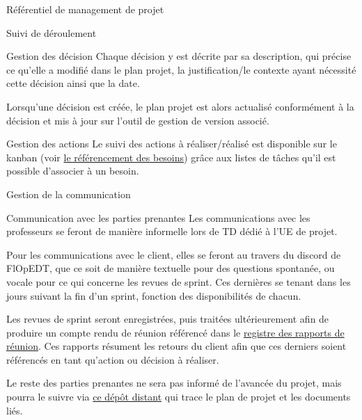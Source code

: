 \documentclass[]{article}
\begin{document}
{\begin{section}{\label{sec:Référentiel de management de projet}Référentiel de management de projet}
\begin{subsection}{\label{sec:Suivi de déroulement}Suivi de déroulement}
\begin{subsubsection}{\label{sec:Gestion des décision}Gestion des décision}
             Chaque décision y est décrite par sa description, qui précise ce qu’elle a modifié dans le plan projet, la justification/le contexte ayant nécessité cette décision ainsi que la date.

             Lorsqu’une décision est créée, le plan projet est alors actualisé conformément à la décision et mis à jour sur l’outil de gestion de version associé.
         \end{subsubsection}

         \begin{subsubsection}{\label{sec:Gestion des actions}Gestion des actions}
             Le suivi des actions à réaliser/réalisé est disponible sur le kanban (voir \hyperref[sec:Référencement des besoins]{le référencement des besoins}) grâce aux listes de tâches qu’il est possible d’associer à un besoin.
         \end{subsubsection}
     \end{subsection}

     \begin{subsection}{\label{sec:Gestion de la communication}Gestion de la communication}
         \begin{subsubsection}{\label{sec:Communication avec les parties prenantes}Communication avec les parties prenantes}
             Les communications avec les professeurs se feront de manière informelle lors de TD dédié à l’UE de projet.

             Pour les communications avec le client, elles se feront au travers du discord de FlOpEDT, que ce soit de manière textuelle pour des questions spontanée, ou vocale pour ce qui concerne les revues de sprint. Ces dernières se tenant dans les jours suivant la fin d’un sprint, fonction des disponibilités de chacun.

             Les revues de sprint seront enregistrées, puis traitées ultérieurement afin de produire un compte rendu de réunion référencé dans le \href{documents/Registre_des_rapports_de_réunion.pdf}{registre des rapports de réunion}. Ces rapports résument les retours du client afin que ces derniers soient référencés en tant qu’action ou décision à réaliser.

             Le reste des parties prenantes ne sera pas informé de l’avancée du projet, mais pourra le suivre via \href{https://github.com/Szyckaa/UE-PROJET-DOCS-GESTION}{ce dépôt distant} qui trace le plan de projet et les documents liés.
         \end{subsubsection}


\end{subsection}
\end{section}}
\end{document}
